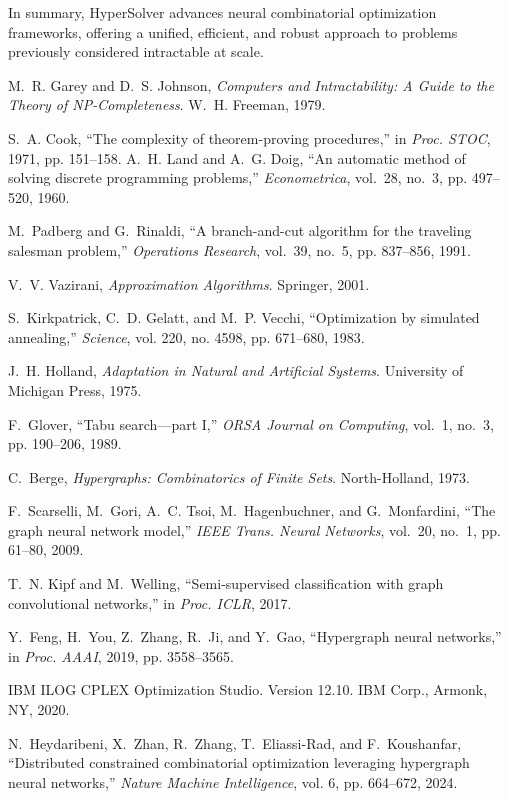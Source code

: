 \documentclass[conference]{IEEEtran}
\begin{document}
In summary, HyperSolver advances neural combinatorial optimization frameworks, offering a unified, efficient, and robust approach to problems previously considered intractable at scale.



\begin{thebibliography}{00}

M.~R. Garey and D.~S. Johnson, \emph{Computers and Intractability: A Guide to the Theory of NP-Completeness}. W.~H. Freeman, 1979.

S.~A. Cook, ``The complexity of theorem-proving procedures,'' in \emph{Proc. STOC}, 1971, pp. 151--158.
A.~H. Land and A.~G. Doig, ``An automatic method of solving discrete programming problems,'' \emph{Econometrica}, vol.~28, no.~3, pp. 497--520, 1960.

M.~Padberg and G.~Rinaldi, ``A branch-and-cut algorithm for the traveling salesman problem,'' \emph{Operations Research}, vol.~39, no.~5, pp. 837--856, 1991.

V.~V. Vazirani, \emph{Approximation Algorithms}. Springer, 2001.

S.~Kirkpatrick, C.~D. Gelatt, and M.~P. Vecchi, ``Optimization by simulated annealing,'' \emph{Science}, vol. 220, no. 4598, pp. 671--680, 1983.

J.~H. Holland, \emph{Adaptation in Natural and Artificial Systems}. University of Michigan Press, 1975.

F.~Glover, ``Tabu search—part I,'' \emph{ORSA Journal on Computing}, vol.~1, no.~3, pp. 190--206, 1989.

C.~Berge, \emph{Hypergraphs: Combinatorics of Finite Sets}. North-Holland, 1973.

F.~Scarselli, M.~Gori, A.~C. Tsoi, M.~Hagenbuchner, and G.~Monfardini, ``The graph neural network model,'' \emph{IEEE Trans. Neural Networks}, vol.~20, no.~1, pp. 61--80, 2009.

T.~N. Kipf and M.~Welling, ``Semi-supervised classification with graph convolutional networks,'' in \emph{Proc. ICLR}, 2017.

Y.~Feng, H.~You, Z.~Zhang, R.~Ji, and Y.~Gao, ``Hypergraph neural networks,'' in \emph{Proc. AAAI}, 2019, pp. 3558--3565.

IBM ILOG CPLEX Optimization Studio.
Version 12.10. IBM Corp., Armonk, NY, 2020.

N.~Heydaribeni, X.~Zhan, R.~Zhang, T.~Eliassi-Rad, and F.~Koushanfar,
``Distributed constrained combinatorial optimization leveraging hypergraph neural networks,''
\emph{Nature Machine Intelligence}, vol. 6, pp. 664--672, 2024.



\end{thebibliography}
\end{document}
